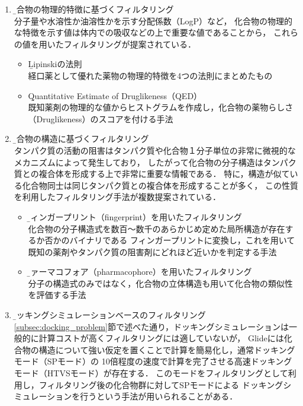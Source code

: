 \begin{enumerate}
\item \b{化合物の物理的特徴に基づくフィルタリング}\\
	分子量や水溶性か油溶性かを示す分配係数（LogP）など，
	化合物の物理的な特徴を示す値は体内での吸収などの上で重要な値であることから，
	これらの値を用いたフィルタリングが提案されている．
	\begin{itemize}
	\item \b{Lipinskiの法則\cite{Lipinski1997}}\\
		経口薬として優れた薬物の物理的特徴を4つの法則にまとめたもの
	\item \b{Quantitative Estimate of Druglikeness（QED）\cite{Bickerton2012}}\\
		既知薬剤の物理的な値からヒストグラムを作成し，化合物の薬物らしさ（Druglikeness）のスコアを付ける手法
	\end{itemize}
\item \b{化合物の構造に基づくフィルタリング}\\
	タンパク質の活動の阻害はタンパク質や化合物１分子単位の非常に微視的なメカニズムによって発生しており，
	したがって化合物の分子構造はタンパク質との複合体を形成する上で非常に重要な情報である．
	特に，構造が似ている化合物同士は同じタンパク質との複合体を形成することが多く，
	この性質を利用したフィルタリング手法が複数提案されている．
	\begin{itemize}
	\item \b{フィンガープリント（fingerprint）を用いたフィルタリング\cite{Nilakantan1993}}\\
		化合物の分子構造式を数百～数千のあらかじめ定めた局所構造が存在するか否かのバイナリである
		フィンガープリントに変換し，これを用いて既知の薬剤やタンパク質の阻害剤にどれほど近いかを判定する手法
	\item \b{ファーマコフォア（pharmacophore）を用いたフィルタリング\cite{Parenti2003}}\\
		分子の構造式のみではなく，化合物の立体構造も用いて化合物の類似性を評価する手法
	\end{itemize}
\item \b{ドッキングシミュレーションベースのフィルタリング}\\
	\ref{subsec:docking_problem}節で述べた通り，ドッキングシミュレーションは一般的に計算コストが高くフィルタリングには適していないが，
	Glideには化合物の構造について強い仮定を置くことで計算を簡易化し，通常ドッキングモード（SPモード）の
	10倍程度の速度\cite{GlideHomePage}で計算を完了させる高速ドッキングモード（HTVSモード）が存在する．
	このモードをフィルタリングとして利用し，フィルタリング後の化合物群に対してSPモードによる
	ドッキングシミュレーションを行うという手法が用いられることがある\cite{Fujimoto2008, Grover2012}．
\end{enumerate}

